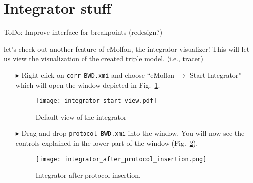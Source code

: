 \newpage
\section{Integrator stuff}
\label{sec:app_integrator}

ToDo: Improve interface for breakpoints (redesign?)

let's check out another feature of eMolfon, the integrator visualizer! This will let us view the visualization of the created
triple model. (i.e., tracer)

\begin{itemize}

\item[$\blacktriangleright$] Right-click on \texttt{corr\_BWD.xmi} and choose ``eMoflon $\rightarrow$ Start Integrator'' which will open the window depicted in
Fig.~\ref{fig:integrator_start}.

\vspace{0.5cm}

\begin{figure}[htbp]
\begin{center}
  \texttt{[image: integrator\_start\_view.pdf]}
  \caption{Default view of the integrator}
  \label{fig:integrator_start}
\end{center}
\end{figure}

\item[$\blacktriangleright$] Drag and drop \texttt{protocol\_BWD.xmi} into the window. You will now see the controls explained in the lower part of the window 
(Fig.~\ref{fig:integrator_after_protocol}).

\begin{figure}[h!]
\begin{center}
  \texttt{[image: integrator\_after\_protocol\_insertion.png]}
  \caption{Integrator after protocol insertion.}
  \label{fig:integrator_after_protocol}
\end{center}
\end{figure} 
\FloatBarrier


\end{itemize}
